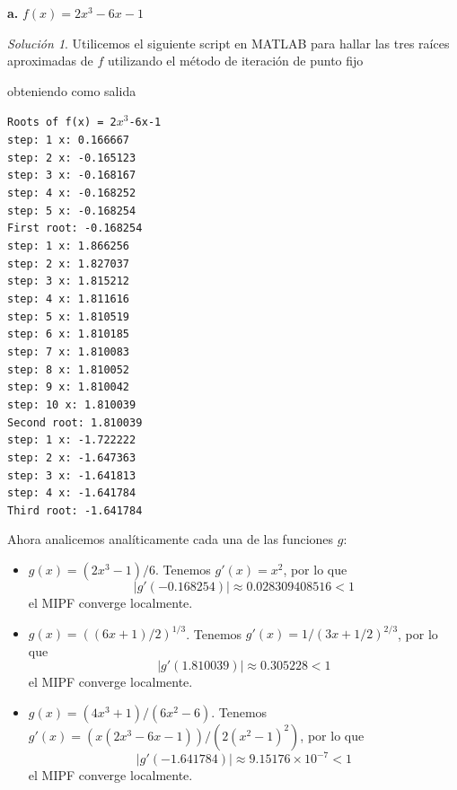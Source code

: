 \documentclass{article}
\newenvironment{statement}[1]{\smallskip\noindent\color[rgb]{1.00,0.00,0.50} {\bf #1.}}{}
\theoremstyle{definition}
\theoremstyle{remark}
\newtheorem*{solution}{Soluci\'on}
\begin{document}
\begin{statement}{a}
  $f(x) = 2x^3 - 6x - 1$
\end{statement}

\begin{solution}
  Utilicemos el siguiente script en MATLAB para hallar las tres ra\'ices aproximadas
  de $f$ utilizando el m\'etodo de iteraci\'on de punto fijo
  
  obteniendo como salida
  
  \begin{center}
    \texttt{Roots of f(x) = 2$x^3$-6x-1}\\
    \texttt{step: 1 x: 0.166667}\\
    \texttt{step: 2 x: -0.165123}\\
    \texttt{step: 3 x: -0.168167}\\
    \texttt{step: 4 x: -0.168252}\\
    \texttt{step: 5 x: -0.168254}\\
    \texttt{First root: -0.168254}\\
    \texttt{step: 1 x: 1.866256}\\
    \texttt{step: 2 x: 1.827037}\\
    \texttt{step: 3 x: 1.815212}\\
    \texttt{step: 4 x: 1.811616}\\
    \texttt{step: 5 x: 1.810519}\\
    \texttt{step: 6 x: 1.810185}\\
    \texttt{step: 7 x: 1.810083}\\
    \texttt{step: 8 x: 1.810052}\\
    \texttt{step: 9 x: 1.810042}\\
    \texttt{step: 10 x: 1.810039}\\
    \texttt{Second root: 1.810039}\\
    \texttt{step: 1 x: -1.722222}\\
    \texttt{step: 2 x: -1.647363}\\
    \texttt{step: 3 x: -1.641813}\\
    \texttt{step: 4 x: -1.641784}\\
    \texttt{Third root: -1.641784}
  \end{center}

  Ahora analicemos anal\'iticamente cada una de las funciones $g$:
  \begin{itemize}
    \item $g(x) = (2x^3 - 1) / 6$. Tenemos $g'(x) = x^2$, por lo que
    \[
      |g'(-0.168254)| \approx 0.028309408516 < 1
    \]
    el MIPF converge localmente.
    \item $g(x) = ((6x + 1) / 2)^{1 / 3}$. Tenemos $g'(x) = 1 / (3x + 1/2)^{2 / 3}$, por lo que
    \[
      |g'(1.810039)| \approx 0.305228 < 1  
    \]
    el MIPF converge localmente.
    \item $g(x) = (4x^3 + 1) / (6x^2 - 6)$. Tenemos $g'(x) = (x (2x^3 - 6x - 1)) / (2(x^2 - 1)^2)$, por lo que
    \[
      |g'(-1.641784)| \approx 9.15176 \times 10^{-7}< 1
    \]
    el MIPF converge localmente.
  \end{itemize}
\end{solution}
\end{document}
